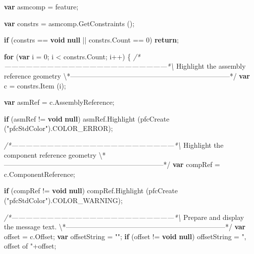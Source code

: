 \documentclass[]{article}
\newenvironment{Shaded}{}{}
\newcommand{\KeywordTok}[1]{\textcolor[rgb]{0.00,0.44,0.13}{\textbf{{#1}}}}
\newcommand{\DecValTok}[1]{\textcolor[rgb]{0.25,0.63,0.44}{{#1}}}
\newcommand{\StringTok}[1]{\textcolor[rgb]{0.25,0.44,0.63}{{#1}}}
\newcommand{\CommentTok}[1]{\textcolor[rgb]{0.38,0.63,0.69}{\textit{{#1}}}}
\newcommand{\OtherTok}[1]{\textcolor[rgb]{0.00,0.44,0.13}{{#1}}}
\newcommand{\FunctionTok}[1]{\textcolor[rgb]{0.02,0.16,0.49}{{#1}}}
\newcommand{\NormalTok}[1]{{#1}}
\begin{document}
\begin{Shaded}
\begin{Highlighting}[]
  \KeywordTok{var} \NormalTok{asmcomp = feature;}
  
  \KeywordTok{var} \NormalTok{constrs = }\OtherTok{asmcomp}\NormalTok{.}\FunctionTok{GetConstraints} \NormalTok{();}
  
  \KeywordTok{if} \NormalTok{(constrs == }\KeywordTok{void} \KeywordTok{null} \NormalTok{|| }\OtherTok{constrs}\NormalTok{.}\FunctionTok{Count} \NormalTok{== }\DecValTok{0}\NormalTok{)}
    \KeywordTok{return}\NormalTok{;}
  
  \KeywordTok{for} \NormalTok{(}\KeywordTok{var} \NormalTok{i = }\DecValTok{0}\NormalTok{; i < }\OtherTok{constrs}\NormalTok{.}\FunctionTok{Count}\NormalTok{; i++)}
    \NormalTok{\{}
\CommentTok{/*---------------------------------------------------------------------*\textbackslash{}}
  \NormalTok{Highlight the assembly reference geometry}
\NormalTok{\textbackslash{}*---------------------------------------------------------------------*}\OtherTok{/}
      \KeywordTok{var} \NormalTok{c = }\OtherTok{constrs}\NormalTok{.}\FunctionTok{Item} \NormalTok{(i);}
      
      \KeywordTok{var} \NormalTok{asmRef = }\OtherTok{c}\NormalTok{.}\FunctionTok{AssemblyReference}\NormalTok{;}
      
      \KeywordTok{if} \NormalTok{(asmRef != }\KeywordTok{void} \KeywordTok{null}\NormalTok{)}
    \OtherTok{asmRef}\NormalTok{.}\FunctionTok{Highlight} \NormalTok{(}\FunctionTok{pfcCreate} \NormalTok{(}\StringTok{"pfcStdColor"}\NormalTok{).}\FunctionTok{COLOR_ERROR}\NormalTok{);}

\CommentTok{/*---------------------------------------------------------------------*\textbackslash{}}
  \NormalTok{Highlight the component reference geometry}
\NormalTok{\textbackslash{}*---------------------------------------------------------------------*}\OtherTok{/}
      \KeywordTok{var} \NormalTok{compRef = }\OtherTok{c}\NormalTok{.}\FunctionTok{ComponentReference}\NormalTok{;}
      
      \KeywordTok{if} \NormalTok{(compRef != }\KeywordTok{void} \KeywordTok{null}\NormalTok{)}
    \OtherTok{compRef}\NormalTok{.}\FunctionTok{Highlight} \NormalTok{(}\FunctionTok{pfcCreate} \NormalTok{(}\StringTok{"pfcStdColor"}\NormalTok{).}\FunctionTok{COLOR_WARNING}\NormalTok{);}
      
\CommentTok{/*---------------------------------------------------------------------*\textbackslash{}}
  \NormalTok{Prepare and display the message }\OtherTok{text}\NormalTok{.}
\NormalTok{\textbackslash{}*---------------------------------------------------------------------*}\OtherTok{/}
      \KeywordTok{var} \NormalTok{offset = }\OtherTok{c}\NormalTok{.}\FunctionTok{Offset}\NormalTok{;}
      \KeywordTok{var} \NormalTok{offsetString = }\StringTok{""}\NormalTok{;}
      \KeywordTok{if} \NormalTok{(offset != }\KeywordTok{void} \KeywordTok{null}\NormalTok{)}
    \NormalTok{offsetString = }\StringTok{", offset of "}\NormalTok{+offset;}
      

\end{Highlighting}
\end{Shaded}
\end{document}
